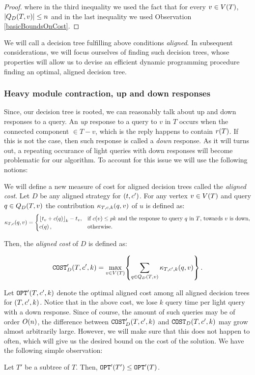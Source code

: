 \begin{lemma}
\begin{proof}
        where in the third inequality we used the fact that for every $v\in V\mathopen{}\left( T \right)$, $\mathopen{}\left| Q_{D}\mathopen{}\left( T,v \right) \right|\leq n$ and in the last inequality we used Observation \ref{basicBoundsOnCost}.
    \end{proof}
\end{lemma}

We will call a decision tree fulfilling above conditions \textit{aligned}. In subsequent considerations, we will focus ourselves of finding such decision trees, whose properties will allow us to devise an efficient dynamic programming procedure finding an optimal, aligned decision tree. 

\subsubsection{Heavy module contraction, up and down responses}
Since, our decision tree is rooted, we can reasonably talk about up and down responses to a query. An \textit{up} response to a query to $v$ in $T$ occurs when the connected component $\in T-v$, which is the reply happens to contain $r\mathopen{}\left( T \right)$. If this is not the case, then such response is called a \textit{down} response. As it will turns out, a repeating occurance of light queries with down responses will become problematic for our algorithm. To account for this issue we will use the following notions:

We will define a new measure of cost for aligned decision trees called the \textit{aligned cost}. Let $D$ be any aligned strategy for $\mathopen{}\left( t,c' \right)$. For any  vertex $v\in V\mathopen{}\left( T \right)$ and query $q\in Q_{D}\mathopen{}\left( T,v \right)$ the contribution $\kappa_{T,c,k}\mathopen{}\left( q,v \right)$ of $u$ is defined as:
$$
\kappa_{T,c}\mathopen{}\left( q, v \right)= \begin{cases}
    \mathopen{}\left\lfloor t_v+c\mathopen{}\left( q \right) \right\rfloor_k-t_v, & \text{if } c\mathopen{}\left( v \right)\leq pk \text{ and the response to query $q$ in $T$, towards $v$ is down},\\
    c\mathopen{}\left( q \right), & \text{otherwise}.
\end{cases}
$$

Then, the \textit{aligned cost} of $D$ is defined as:

$$
\texttt{COST}'_D\mathopen{}\left( T,c',k \right)=\max_{v\in V\mathopen{}\left( T \right)}\mathopen{}\left\{ \sum_{q\in Q_D\mathopen{}\left( T,v \right)}\kappa_{T,c', k}\mathopen{}\left( q,v \right) \right\}.
$$

Let $\texttt{OPT}'\mathopen{}\left( T,c',k \right)$ denote the optimal aligned cost among all aligned decision trees for $\mathopen{}\left( T,c',k \right)$.
Notice that in the above cost, we lose $k$ query time per light query with a down response. Since of course, the amount of such queries may be of order $O\mathopen{}\left( n \right)$, the difference between $\texttt{COST}'_D\mathopen{}\left( T,c',k \right)$ and $\texttt{COST}_D\mathopen{}\left( T,c',k \right)$ may grow almost arbitrarily large. However, we will make sure that this does not happen to often, which will give us the desired bound on the cost of the solution. We have the following simple observation:
\begin{observation}\label{aligned_subtree_opt_observation}
    Let $T'$ be a subtree of $T$. Then, $\texttt{OPT}'\mathopen{}\left( T' \right)\leq\texttt{OPT}'\mathopen{}\left( T \right)$.
\end{observation}

